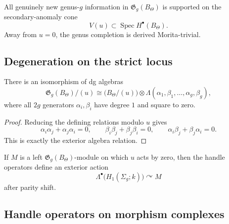 \begin{corollary}
\label{cor:tholog-localization-principle}
All genuinely new genus-\(g\) information in \(\mathfrak{G}_{g}(B_{\Theta})\) is supported on the secondary-anomaly cone
\[
V(u)\subset \operatorname{Spec}H^{\bullet}(B_{\Theta}).
\]
Away from \(u=0\), the genus completion is derived Morita-trivial.
\end{corollary}

\subsection{Degeneration on the strict locus}
\label{subsec:tholog-degeneration-strict-locus}

\begin{theorem}
\label{thm:tholog-exterior-degeneration}
There is an isomorphism of dg algebras
\[
\mathfrak{G}_{g}(B_{\Theta})/(u)
\cong
\big(B_{\Theta}/(u)\big)\otimes
\Lambda(\alpha_{1},\beta_{1},\dots,\alpha_{g},\beta_{g}),
\]
where all \(2g\) generators \(\alpha_{i},\beta_{i}\) have degree \(1\) and square to zero.
\end{theorem}

\begin{proof}
Reducing the defining relations modulo \(u\) gives
\[
\alpha_{i}\alpha_{j}+\alpha_{j}\alpha_{i}=0,\qquad
\beta_{i}\beta_{j}+\beta_{j}\beta_{i}=0,\qquad
\alpha_{i}\beta_{j}+\beta_{j}\alpha_{i}=0.
\]
This is exactly the exterior algebra relation.
\end{proof}

\begin{corollary}
\label{cor:tholog-handle-action-strict-sector}
If \(M\) is a left \(\mathfrak{G}_{g}(B_{\Theta})\)-module on which \(u\) acts by zero, then the handle operators define an exterior action
\[
\Lambda^{\bullet}\big(H_{1}(\Sigma_{g};k)\big)\curvearrowright M
\]
after parity shift.
\end{corollary}

\subsection{Handle operators on morphism complexes}
\label{subsec:tholog-handle-operators-on-morphisms}


